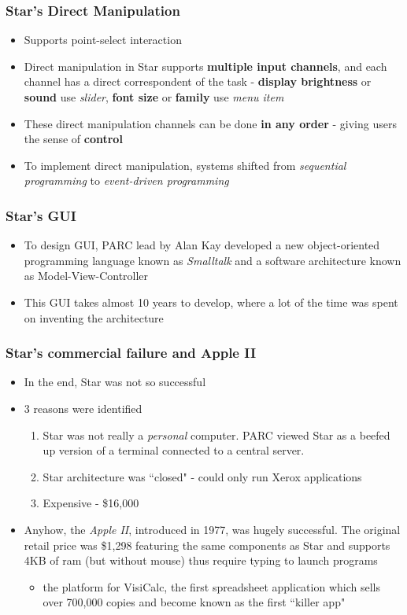 \documentclass{beamer}
\begin{document}
\begin{frame}
\frametitle{Star's Direct Manipulation}
\begin{itemize}
	\item Supports point-select interaction
	\item Direct manipulation in Star supports \textbf{multiple input channels}, and each channel has a direct correspondent of the task - \textbf{display brightness} or \textbf{sound} use \textit{slider}, \textbf{font size} or \textbf{family} use \textit{menu item}
	\item These direct manipulation channels can be done \textbf{in any order} - giving users the sense of \textbf{control}
	\item To implement direct manipulation, systems shifted from \textit{sequential programming} to \textit{event-driven programming}
\end{itemize}
\end{frame}

\begin{frame}
\frametitle{Star's GUI}
\begin{itemize}
	\item To design GUI, PARC lead by Alan Kay developed a new object-oriented programming language known as \textit{Smalltalk} and a software architecture known as Model-View-Controller
	\item This GUI takes almost 10 years to develop, where a lot of the time was spent on inventing the architecture
\end{itemize}
\end{frame}

\begin{frame}
\frametitle{Star's commercial failure and Apple II}
\begin{itemize}
	\item In the end, Star was not so successful
	\item 3 reasons were identified
	\begin{enumerate}
		\item Star was not really a \textit{personal} computer.  PARC viewed Star as a beefed up version of a terminal connected to a central server.
		\item Star architecture was ``closed" - could only run Xerox applications
		\item Expensive - \$16,000
	\end{enumerate}
	\item Anyhow, the \textit{Apple II}, introduced in 1977, was hugely successful.  The original retail price was \$1,298 featuring the same components as Star and supports 4KB of ram (but without mouse) thus require typing to launch programs
	\begin{itemize}
		\item the platform for VisiCalc, the first spreadsheet application which sells over 700,000 copies and become known as the first ``killer app"
	\end{itemize}
\end{itemize}
\end{frame}
\end{document}
